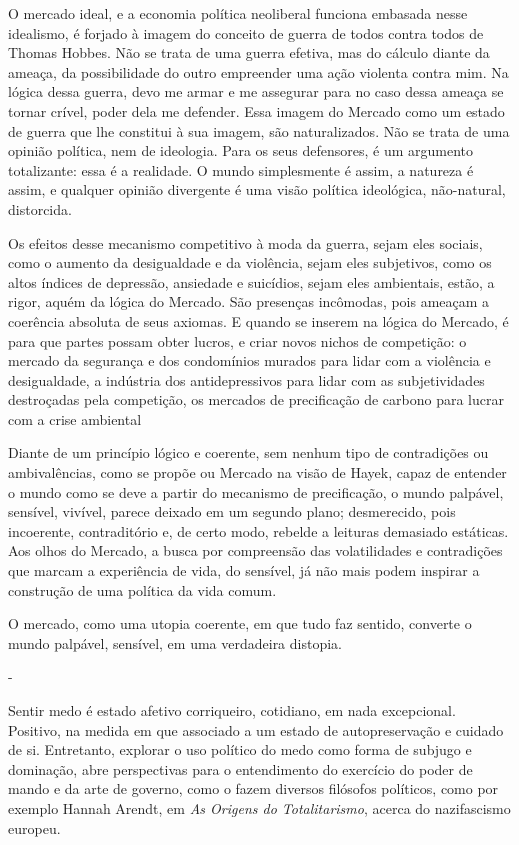 O mercado ideal, e a economia política neoliberal funciona embasada
nesse idealismo, é forjado à imagem do conceito de guerra de todos
contra todos de Thomas Hobbes. Não se trata de uma guerra efetiva, mas
do cálculo diante da ameaça, da possibilidade do outro empreender uma
ação violenta contra mim. Na lógica dessa guerra, devo me armar e me
assegurar para no caso dessa ameaça se tornar crível, poder dela me
defender. Essa imagem do Mercado como um estado de guerra que lhe
constitui à sua imagem, são naturalizados. Não se trata de uma opinião
política, nem de ideologia. Para os seus defensores, é um argumento
totalizante: essa é a realidade. O mundo simplesmente é assim, a
natureza é assim, e qualquer opinião divergente é uma visão política
ideológica, não-natural, distorcida.

Os efeitos desse mecanismo competitivo à moda da guerra, sejam eles
sociais, como o aumento da desigualdade e da violência, sejam eles
subjetivos, como os altos índices de depressão, ansiedade e suicídios,
sejam eles ambientais, estão, a rigor, aquém da lógica do Mercado. São
presenças incômodas, pois ameaçam a coerência absoluta de seus axiomas.
E quando se inserem na lógica do Mercado, é para que partes possam obter
lucros, e criar novos nichos de competição: o mercado da segurança e dos
condomínios murados para lidar com a violência e desigualdade, a
indústria dos antidepressivos para lidar com as subjetividades
destroçadas pela competição, os mercados de precificação de carbono para
lucrar com a crise ambiental

Diante de um princípio lógico e coerente, sem nenhum tipo de
contradições ou ambivalências, como se propõe ou Mercado na visão de
Hayek, capaz de entender o mundo como se deve a partir do mecanismo de
precificação, o mundo palpável, sensível, vivível, parece deixado em um
segundo plano; desmerecido, pois incoerente, contraditório e, de certo
modo, rebelde a leituras demasiado estáticas. Aos olhos do Mercado, a
busca por compreensão das volatilidades e contradições que marcam a
experiência de vida, do sensível, já não mais podem inspirar a
construção de uma política da vida comum.

O mercado, como uma utopia coerente, em que tudo faz sentido, converte o
mundo palpável, sensível, em uma verdadeira distopia.

-

Sentir medo é estado afetivo corriqueiro, cotidiano, em nada
excepcional. Positivo, na medida em que associado a um estado de
autopreservação e cuidado de si. Entretanto, explorar o uso político do
medo como forma de subjugo e dominação, abre perspectivas para o
entendimento do exercício do poder de mando e da arte de governo, como o
fazem diversos filósofos políticos, como por exemplo Hannah Arendt, em
\emph{As Origens do Totalitarismo}, acerca do nazifascismo europeu.

